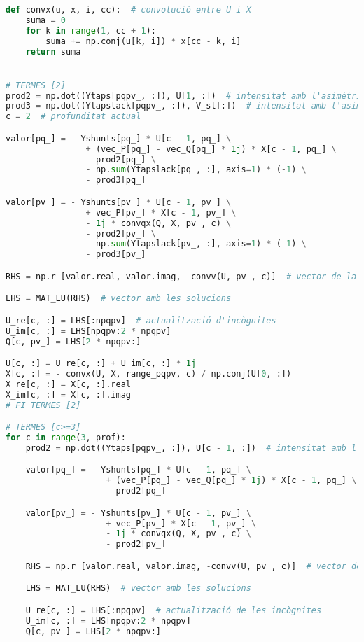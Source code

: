 \begin{lstlisting}[language=Python,numbers=none]
def convx(u, x, i, cc):  # convolució entre U i X
    suma = 0
    for k in range(1, cc + 1):
        suma += np.conj(u[k, i]) * x[cc - k, i]
    return suma


# TERMES [2]
prod2 = np.dot((Ytaps[pqpv_, :]), U[1, :])  # intensitat amb l'asimètrica pels PQ i PV
prod3 = np.dot((Ytapslack[pqpv_, :]), V_sl[:])  # intensitat amb l'asimètrica pels oscil·lants
c = 2  # profunditat actual

valor[pq_] = - Yshunts[pq_] * U[c - 1, pq_] \
                + (vec_P[pq_] - vec_Q[pq_] * 1j) * X[c - 1, pq_] \
                - prod2[pq_] \
                - np.sum(Ytapslack[pq_, :], axis=1) * (-1) \
                - prod3[pq_]

valor[pv_] = - Yshunts[pv_] * U[c - 1, pv_] \
                + vec_P[pv_] * X[c - 1, pv_] \
                - 1j * convqx(Q, X, pv_, c) \
                - prod2[pv_] \
                - np.sum(Ytapslack[pv_, :], axis=1) * (-1) \
                - prod3[pv_]

RHS = np.r_[valor.real, valor.imag, -convv(U, pv_, c)]  # vector de la dreta del sistema d'equacions

LHS = MAT_LU(RHS)  # vector amb les solucions

U_re[c, :] = LHS[:npqpv]  # actualització d'incògnites
U_im[c, :] = LHS[npqpv:2 * npqpv]
Q[c, pv_] = LHS[2 * npqpv:]

U[c, :] = U_re[c, :] + U_im[c, :] * 1j
X[c, :] = - convx(U, X, range_pqpv, c) / np.conj(U[0, :])
X_re[c, :] = X[c, :].real
X_im[c, :] = X[c, :].imag
# FI TERMES [2]

# TERMES [c>=3]
for c in range(3, prof):
    prod2 = np.dot((Ytaps[pqpv_, :]), U[c - 1, :])  # intensitat amb l'asimètrica dels PQ i PV

    valor[pq_] = - Yshunts[pq_] * U[c - 1, pq_] \
                    + (vec_P[pq_] - vec_Q[pq_] * 1j) * X[c - 1, pq_] \
                    - prod2[pq_]

    valor[pv_] = - Yshunts[pv_] * U[c - 1, pv_] \
                    + vec_P[pv_] * X[c - 1, pv_] \
                    - 1j * convqx(Q, X, pv_, c) \
                    - prod2[pv_]

    RHS = np.r_[valor.real, valor.imag, -convv(U, pv_, c)]  # vector de la dreta del sistema d'equacions

    LHS = MAT_LU(RHS)  # vector amb les solucions

    U_re[c, :] = LHS[:npqpv]  # actualització de les incògnites
    U_im[c, :] = LHS[npqpv:2 * npqpv]
    Q[c, pv_] = LHS[2 * npqpv:]


\end{lstlisting}
